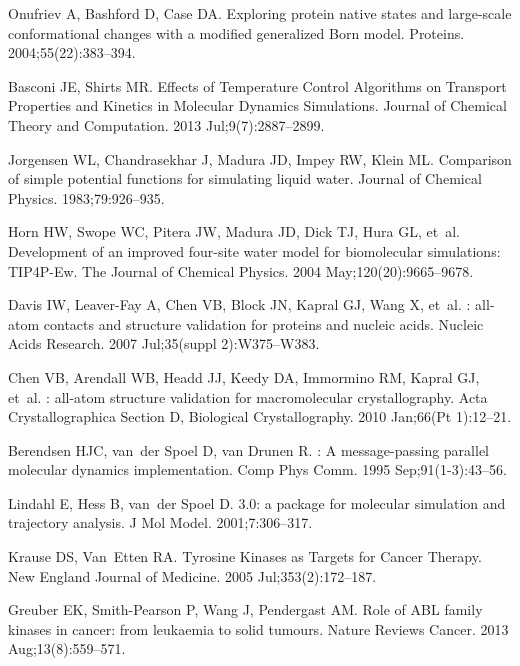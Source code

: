 \documentclass[10pt,letterpaper]{article}
\begin{document}
\begin{thebibliography}{100}
Onufriev A, Bashford D, Case DA.
\newblock Exploring protein native states and large-scale conformational
  changes with a modified generalized {Born} model.
\newblock Proteins. 2004;55(22):383--394.

Basconi JE, Shirts MR.
\newblock Effects of {Temperature} {Control} {Algorithms} on {Transport}
  {Properties} and {Kinetics} in {Molecular} {Dynamics} {Simulations}.
\newblock Journal of Chemical Theory and Computation. 2013 Jul;9(7):2887--2899.

Jorgensen WL, Chandrasekhar J, Madura JD, Impey RW, Klein ML.
\newblock Comparison of simple potential functions for simulating liquid water.
\newblock Journal of Chemical Physics. 1983;79:926--935.

Horn HW, Swope WC, Pitera JW, Madura JD, Dick TJ, Hura GL, et~al.
\newblock Development of an improved four-site water model for biomolecular
  simulations: {TIP}4P-{Ew}.
\newblock The Journal of Chemical Physics. 2004 May;120(20):9665--9678.

Davis IW, Leaver-Fay A, Chen VB, Block JN, Kapral GJ, Wang X, et~al.
: all-atom contacts and structure validation for proteins
  and nucleic acids.
\newblock Nucleic Acids Research. 2007 Jul;35(suppl 2):W375--W383.

Chen VB, Arendall WB, Headd JJ, Keedy DA, Immormino RM, Kapral GJ, et~al.
: all-atom structure validation for macromolecular
  crystallography.
\newblock Acta Crystallographica Section D, Biological Crystallography. 2010
  Jan;66(Pt 1):12--21.

Berendsen HJC, van~der Spoel D, van Drunen R.
: {A} message-passing parallel molecular dynamics
  implementation.
\newblock Comp Phys Comm. 1995 Sep;91(1-3):43--56.

Lindahl E, Hess B, van~der Spoel D.
 3.0: a package for molecular simulation and trajectory
  analysis.
\newblock J Mol Model. 2001;7:306--317.

Krause DS, Van~Etten RA.
\newblock Tyrosine {Kinases} as {Targets} for {Cancer} {Therapy}.
\newblock New England Journal of Medicine. 2005 Jul;353(2):172--187.

Greuber EK, Smith-Pearson P, Wang J, Pendergast AM.
\newblock Role of {ABL} family kinases in cancer: from leukaemia to solid
  tumours.
\newblock Nature Reviews Cancer. 2013 Aug;13(8):559--571.


\end{thebibliography}
\end{document}
